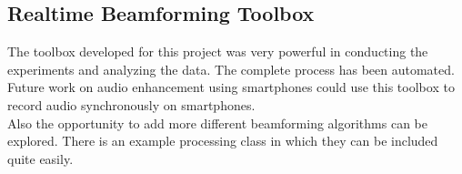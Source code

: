 \subsection{Realtime Beamforming Toolbox}
The \matlab toolbox developed for this project was very powerful in conducting the experiments and analyzing the data. The complete process has been automated. Future work on audio enhancement using smartphones could use this toolbox to record audio synchronously on smartphones.\\
Also the opportunity to add more different beamforming algorithms can be explored. There is an example processing class in which they can be included quite easily.








%
%
